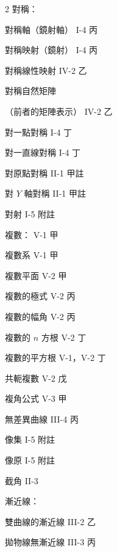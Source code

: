 \begin{multicols}{2}
\noindent 對稱：\par
\noindent\hspace*{1.5em} 對稱軸（鏡射軸） \hfill I-4 丙\par
\noindent\hspace*{1.5em} 對稱映射（鏡射） \hfill I-4 丙\par
\noindent\hspace*{1.5em} 對稱線性映射 \hfill IV-2 乙\par
\noindent\hspace*{1.5em} 對稱自然矩陣\par
\noindent\hspace*{1.5em} （前者的矩陣表示） \hfill IV-2 乙\par
\noindent\hspace*{1.5em} 對一點對稱 \hfill I-4 丁\par
\noindent\hspace*{1.5em} 對一直線對稱 \hfill I-4 丁\par
\noindent\hspace*{1.5em} 對原點對稱 \hfill II-1 甲註\par
\noindent\hspace*{1.5em} 對 $Y$ 軸對稱 \hfill II-1 甲註\par
\noindent 對射 \hfill I-5 附註\par
\noindent 複數： \hfill V-1 甲\par
\noindent\hspace*{1.5em} 複數系 \hfill V-1 甲\par
\noindent\hspace*{1.5em} 複數平面 \hfill V-2 甲\par
\noindent\hspace*{1.5em} 複數的極式 \hfill V-2 丙\par
\noindent\hspace*{1.5em} 複數的幅角 \hfill V-2 丙\par
\noindent\hspace*{1.5em} 複數的 $n$ 方根 \hfill V-2 丁\par
\noindent\hspace*{1.5em} 複數的平方根 \hfill V-1，V-2 丁\par
\noindent\hspace*{1.5em} 共軛複數 \hfill V-2 戊\par
\noindent 複角公式 \hfill V-3 甲\par
\noindent 無差異曲線 \hfill III-4 丙\par
\noindent 像集 \hfill I-5 附註\par
\noindent 像原 \hfill I-5 附註\par
\noindent 截角 \hfill II-3\par
\noindent 漸近線：\par
\noindent\hspace*{1.5em} 雙曲線的漸近線 \hfill III-2 乙\par
\noindent\hspace*{1.5em} 拋物線無漸近線 \hfill III-3 丙\par


\end{multicols}
